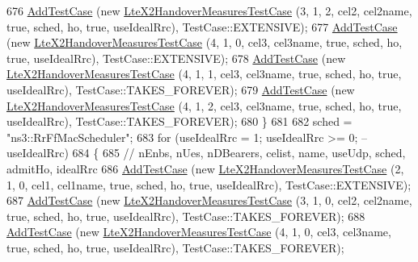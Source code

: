 \begin{DoxyCode}
676       \hyperlink{classns3_1_1TestCase_a3718088e3eefd5d6454569d2e0ddd835}{AddTestCase} (\textcolor{keyword}{new} \hyperlink{classLteX2HandoverMeasuresTestCase}{LteX2HandoverMeasuresTestCase} (3,   1,    2,
          cel2, cel2name, \textcolor{keyword}{true}, sched, ho, \textcolor{keyword}{true}, useIdealRrc), TestCase::EXTENSIVE);
677       \hyperlink{classns3_1_1TestCase_a3718088e3eefd5d6454569d2e0ddd835}{AddTestCase} (\textcolor{keyword}{new} \hyperlink{classLteX2HandoverMeasuresTestCase}{LteX2HandoverMeasuresTestCase} (4,   1,    0,
          cel3, cel3name, \textcolor{keyword}{true}, sched, ho, \textcolor{keyword}{true}, useIdealRrc), TestCase::EXTENSIVE);
678       \hyperlink{classns3_1_1TestCase_a3718088e3eefd5d6454569d2e0ddd835}{AddTestCase} (\textcolor{keyword}{new} \hyperlink{classLteX2HandoverMeasuresTestCase}{LteX2HandoverMeasuresTestCase} (4,   1,    1,
          cel3, cel3name, \textcolor{keyword}{true}, sched, ho, \textcolor{keyword}{true}, useIdealRrc), TestCase::TAKES\_FOREVER);
679       \hyperlink{classns3_1_1TestCase_a3718088e3eefd5d6454569d2e0ddd835}{AddTestCase} (\textcolor{keyword}{new} \hyperlink{classLteX2HandoverMeasuresTestCase}{LteX2HandoverMeasuresTestCase} (4,   1,    2,
          cel3, cel3name, \textcolor{keyword}{true}, sched, ho, \textcolor{keyword}{true}, useIdealRrc), TestCase::TAKES\_FOREVER);
680     \}
681 
682   sched = \textcolor{stringliteral}{"ns3::RrFfMacScheduler"};
683   \textcolor{keywordflow}{for} (useIdealRrc = 1; useIdealRrc >= 0; --useIdealRrc)
684     \{
685       \textcolor{comment}{//                                          nEnbs, nUes, nDBearers, celist, name, useUdp, sched,
       admitHo, idealRrc}
686       \hyperlink{classns3_1_1TestCase_a3718088e3eefd5d6454569d2e0ddd835}{AddTestCase} (\textcolor{keyword}{new} \hyperlink{classLteX2HandoverMeasuresTestCase}{LteX2HandoverMeasuresTestCase} (2,   1,    0,
          cel1, cel1name, \textcolor{keyword}{true}, sched, ho, \textcolor{keyword}{true}, useIdealRrc), TestCase::EXTENSIVE);
687       \hyperlink{classns3_1_1TestCase_a3718088e3eefd5d6454569d2e0ddd835}{AddTestCase} (\textcolor{keyword}{new} \hyperlink{classLteX2HandoverMeasuresTestCase}{LteX2HandoverMeasuresTestCase} (3,   1,    0,
          cel2, cel2name, \textcolor{keyword}{true}, sched, ho, \textcolor{keyword}{true}, useIdealRrc), TestCase::TAKES\_FOREVER);
688       \hyperlink{classns3_1_1TestCase_a3718088e3eefd5d6454569d2e0ddd835}{AddTestCase} (\textcolor{keyword}{new} \hyperlink{classLteX2HandoverMeasuresTestCase}{LteX2HandoverMeasuresTestCase} (4,   1,    0,
          cel3, cel3name, \textcolor{keyword}{true}, sched, ho, \textcolor{keyword}{true}, useIdealRrc), TestCase::TAKES\_FOREVER);

\end{DoxyCode}
